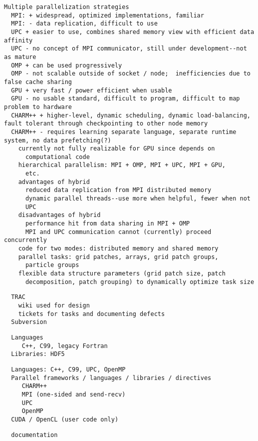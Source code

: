 \documentclass[14pt,letter]{article}
\begin{document}
\begin{verbatim}
Multiple parallelization strategies
  MPI: + widespread, optimized implementations, familiar
  MPI: - data replication, difficult to use
  UPC + easier to use, combines shared memory view with efficient data affinity
  UPC - no concept of MPI communicator, still under development--not as mature
  OMP + can be used progressively
  OMP - not scalable outside of socket / node;  inefficiencies due to false cache sharing
  GPU + very fast / power efficient when usable
  GPU - no usable standard, difficult to program, difficult to map problem to hardware
  CHARM++ + higher-level, dynamic scheduling, dynamic load-balancing, fault tolerant through checkpointing to other node memory
  CHARM++ - requires learning separate language, separate runtime system, no data prefetching(?)
    currently not fully realizable for GPU since depends on
      computational code
    hierarchical parallelism: MPI + OMP, MPI + UPC, MPI + GPU,
      etc.
    advantages of hybrid
      reduced data replication from MPI distributed memory
      dynamic parallel threads--use more when helpful, fewer when not
      UPC
    disadvantages of hybrid
      performance hit from data sharing in MPI + OMP
      MPI and UPC communication cannot (currently) proceed concurrently
    code for two modes: distributed memory and shared memory
    parallel tasks: grid patches, arrays, grid patch groups,
      particle groups
    flexible data structure parameters (grid patch size, patch
      decomposition, patch grouping) to dynamically optimize task size
\end{verbatim}

\begin{verbatim}
  TRAC
    wiki used for design
    tickets for tasks and documenting defects
  Subversion
\end{verbatim}


\begin{verbatim}
  Languages
     C++, C99, legacy Fortran
  Libraries: HDF5
\end{verbatim}

\begin{verbatim}
  Languages: C++, C99, UPC, OpenMP
  Parallel frameworks / languages / libraries / directives
     CHARM++
     MPI (one-sided and send-recv)
     UPC
     OpenMP
  CUDA / OpenCL (user code only)
\end{verbatim}

\begin{verbatim}
  documentation
\end{verbatim}
\end{document}
